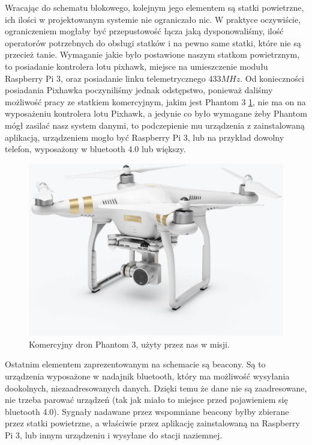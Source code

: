 Wracając do schematu blokowego, kolejnym jego elementem są statki powietrzne, ich ilości w projektowanym systemie nie ograniczało nic. W praktyce oczywiście, ograniczeniem mogłaby być przepustowość łącza jaką dysponowaliśmy, ilość operatorów potrzebnych do obsługi statków i na pewno same statki, które nie są przecież tanie. Wymaganie jakie było postawione naszym statkom powietrznym, to posiadanie kontrolera lotu pixhawk, miejsce na umieszczenie modułu Raspberry Pi 3, oraz posiadanie linku telemetrycznego $433 MHz$. Od konieczności posiadania Pixhawka poczyniliśmy jednak odstępstwo, ponieważ daliśmy możliwość pracy ze statkiem komercyjnym, jakim jest Phantom 3 \ref{fig:phantom}, nie ma on na wyposażeniu kontrolera lotu Pixhawk, a jedynie co było wymagane żeby Phantom mógł zasilać nasz system danymi, to podczepienie mu urządzenia z zainstalowaną aplikacją, urządzeniem mogło być Raspberry Pi 3, lub na przykład dowolny telefon, wyposażony w bluetooth 4.0 lub większy.

\begin{figure}[!th]
    \centering
    \includegraphics[width=15cm]{zalaczniki/obrazy/phantom3.jpg}
	\caption{Komercyjny dron Phantom 3, użyty przez nas w misji.}
    \label{fig:phantom}
\end{figure}

Ostatnim elementem zaprezentowanym na schemacie są beacony. Są to urządzenia wyposażone w nadajnik bluetooth, który ma możliwość wysyłania dookolnych, niezaadresowanych danych. Dzięki temu że dane nie są zaadresowane, nie trzeba parować urządzeń (tak jak miało to miejsce przed pojawieniem się bluetooth 4.0). Sygnały nadawane przez wspomniane beacony byłby zbierane przez statki powietrzne, a właściwie przez aplikację zainstalowaną na Raspberry Pi 3, lub innym urządzeniu i wysyłane do stacji naziemnej.

